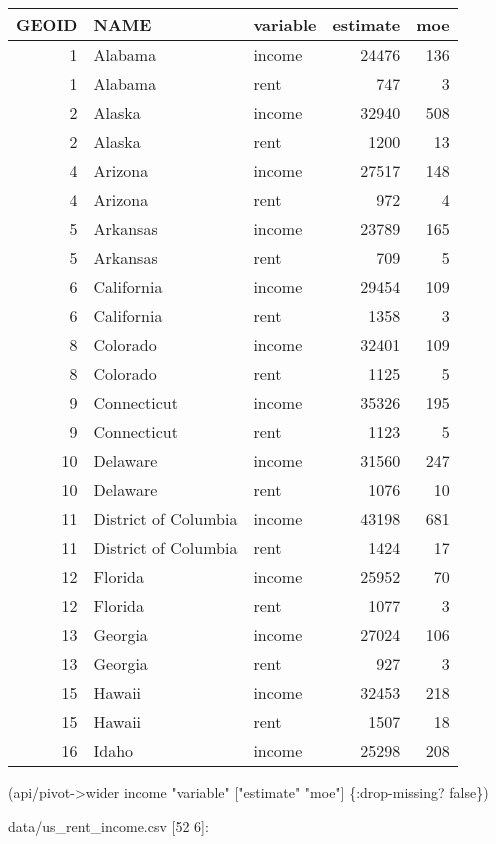 \documentclass[]{article}
\newenvironment{Shaded}{\begin{snugshade}}{\end{snugshade}}
\newcommand{\StringTok}[1]{\textcolor[rgb]{0.31,0.60,0.02}{#1}}
\newcommand{\VariableTok}[1]{\textcolor[rgb]{0.00,0.00,0.00}{#1}}
\newcommand{\AttributeTok}[1]{\textcolor[rgb]{0.77,0.63,0.00}{#1}}
\newcommand{\NormalTok}[1]{#1}
\begin{document}
\begin{longtable}[]{@{}rllrr@{}}
\toprule
GEOID & NAME & variable & estimate & moe\tabularnewline
\midrule
\endhead
1 & Alabama & income & 24476 & 136\tabularnewline
1 & Alabama & rent & 747 & 3\tabularnewline
2 & Alaska & income & 32940 & 508\tabularnewline
2 & Alaska & rent & 1200 & 13\tabularnewline
4 & Arizona & income & 27517 & 148\tabularnewline
4 & Arizona & rent & 972 & 4\tabularnewline
5 & Arkansas & income & 23789 & 165\tabularnewline
5 & Arkansas & rent & 709 & 5\tabularnewline
6 & California & income & 29454 & 109\tabularnewline
6 & California & rent & 1358 & 3\tabularnewline
8 & Colorado & income & 32401 & 109\tabularnewline
8 & Colorado & rent & 1125 & 5\tabularnewline
9 & Connecticut & income & 35326 & 195\tabularnewline
9 & Connecticut & rent & 1123 & 5\tabularnewline
10 & Delaware & income & 31560 & 247\tabularnewline
10 & Delaware & rent & 1076 & 10\tabularnewline
11 & District of Columbia & income & 43198 & 681\tabularnewline
11 & District of Columbia & rent & 1424 & 17\tabularnewline
12 & Florida & income & 25952 & 70\tabularnewline
12 & Florida & rent & 1077 & 3\tabularnewline
13 & Georgia & income & 27024 & 106\tabularnewline
13 & Georgia & rent & 927 & 3\tabularnewline
15 & Hawaii & income & 32453 & 218\tabularnewline
15 & Hawaii & rent & 1507 & 18\tabularnewline
16 & Idaho & income & 25298 & 208\tabularnewline
\bottomrule
\end{longtable}

\begin{Shaded}
\begin{Highlighting}[]
\NormalTok{(api/pivot->wider income }\StringTok{"variable"}\NormalTok{ [}\StringTok{"estimate"} \StringTok{"moe"}\NormalTok{] \{}\AttributeTok{:drop-missing}\NormalTok{? }\VariableTok{false}\NormalTok{\})}
\end{Highlighting}
\end{Shaded}

data/us\_rent\_income.csv {[}52 6{]}:
\end{document}
